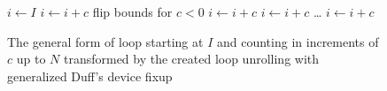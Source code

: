 \begin{figure}[H]
    \centering
    \begin{algorithmic}
        \State $i \gets I$
                \State {} 
                \State $i \gets i + c$ 
            \EndWhile
        \EndIf
             \Comment flip bounds for $c < 0$
                \State {}
                \State $i \gets i + c$ 
            \EndCase
                \State {}
                \State $i \gets i + c$ 
            \EndCase
            \State
            \ldots
                \State {}
                \State $i \gets i + c$
            \EndCase
        \EndSwitch
        \EndFunction
    \end{algorithmic}
    \caption{The general form of loop starting at $I$ and counting in increments of $c$ up to $N$ transformed by the created loop unrolling with generalized Duff's device fixup}
    \label{fig:impl:fixup:duff:general-loop}
\end{figure}